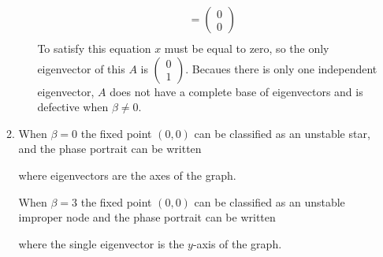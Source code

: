 \documentclass[10pt]{article}
\begin{document}
\begin{enumerate}
\begin{enumerate}
\begin{enumerate}
\begin{align*}
                        &=
                      \begin{pmatrix} 0 \\ 0 \end{pmatrix} \\
                    \end{align*}
                  To satisfy this equation $x$ must be equal to zero, so the only eigenvector of this $A$ is
                      $\begin{pmatrix} 0 \\ 1 \end{pmatrix}$.  Becaues there is
                        only one independent eigenvector, $A$ does not have a
                        complete base of eigenvectors and is defective when
                        $\beta \not= 0$.
              \end{enumerate}
            \item When $\beta = 0$ the fixed point $(0,0)$ can be classified as
              an unstable star, and the phase portrait can be written

              \bigskip
              \bigskip
              \bigskip
              \bigskip
              \bigskip
              \bigskip
              \bigskip
              \bigskip
              \bigskip
              \bigskip
              \bigskip
              \bigskip
              \bigskip
              \bigskip

              where eigenvectors are the axes of the graph.

              When $\beta = 3$ the fixed point $(0, 0)$ can be classified as an
              unstable improper node and the phase portrait can be written

              \bigskip
              \bigskip
              \bigskip
              \bigskip
              \bigskip
              \bigskip
              \bigskip
              \bigskip
              \bigskip
              \bigskip
              \bigskip
              \bigskip
              \bigskip
              \bigskip

              where the single eigenvector is the $y$-axis of the graph.



\end{enumerate}
\end{enumerate}
\end{document}
